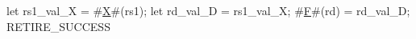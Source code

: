 let rs1_val_X = #\hyperref[sailRISCVzX]{X}#(rs1);
let rd_val_D  = rs1_val_X;
#\hyperref[sailRISCVzF]{F}#(rd)         = rd_val_D;
RETIRE_SUCCESS
